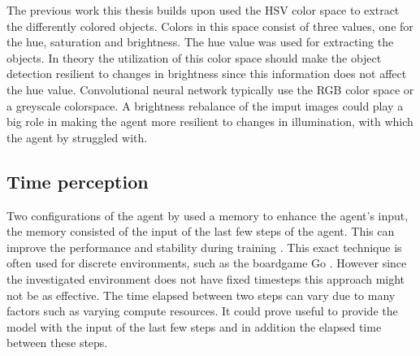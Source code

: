 The previous work this thesis builds upon used the HSV color space to extract the differently colored objects. Colors in this space consist of three values, one for the hue, saturation and brightness. The hue value was used for extracting the objects. In theory the utilization of this color space should make the object detection resilient to changes in brightness since this information does not affect the hue value.
Convolutional neural network typically use the RGB color space or a greyscale colorspace. A brightness rebalance of the imput images could play a big role in making the agent more resilient to changes in illumination, with which the agent by \autocite{maximilian} struggled with.


\subsection{Time perception}

Two configurations of the agent by \autocite{maximilian} used a memory to enhance the agent's input, the memory consisted of the input of the last few steps of the agent. This can improve the performance and stability during training \autocite{memory}.
This exact technique is often used for discrete environments, such as the boardgame Go \autocite{alphago}. However since the investigated environment does not have fixed timesteps this approach might not be as effective. The time elapsed between two steps can vary due to many factors such as varying compute resources. It could prove useful to provide the model with the input of the last few steps and in addition the elapsed time between these steps.















